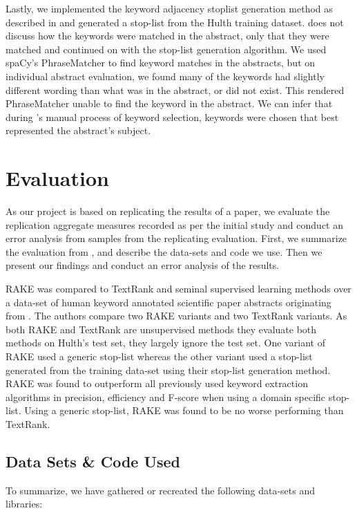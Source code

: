 \documentclass[11pt,a4paper]{article}
\begin{document}
Lastly, we implemented the keyword adjacency stoplist generation method as described in \citet{1} and generated a stop-list from the Hulth training dataset. \citet{1} does not discuss how the keywords were matched in the abstract, only that they were matched and continued on with the stop-list generation algorithm. We used spaCy's PhraseMatcher to find keyword matches in the abstracts, but on individual abstract evaluation, we found many of the keywords had slightly different wording than what was in the abstract, or did not exist. This rendered PhraseMatcher unable to find the keyword in the abstract. We can infer that during \citet{hulth-2003-improved}'s manual process of keyword selection, keywords were chosen that best represented the abstract's subject.

\section{Evaluation}

As our project is based on replicating the results of a paper, we evaluate the replication aggregate measures recorded as per the initial study and conduct an error analysis from samples from the replicating evaluation. First, we summarize the evaluation from , and describe the data-sets and code we use. Then we present our findings and conduct an error analysis of the results. 

RAKE was compared to TextRank and seminal supervised learning methods \citep{hulth-2003-improved} over a data-set of human keyword annotated scientific paper abstracts originating from \citet{hulth-2003-improved}. The authors compare two RAKE variants and two TextRank variants. As both RAKE and TextRank are unsupervised methods they evaluate both methods on Hulth's test set, they largely ignore the test set. One variant of RAKE used a generic stop-list whereas the other variant used a stop-list generated from the training data-set using their stop-list generation method. RAKE was found to outperform all previously used keyword extraction algorithms in precision, efficiency and F-score when using a domain specific stop-list. Using a generic stop-list, RAKE was found to be no worse performing than TextRank.

\subsection{Data Sets \& Code Used}
To summarize, we have gathered or recreated the following data-sets and libraries:
\end{document}
